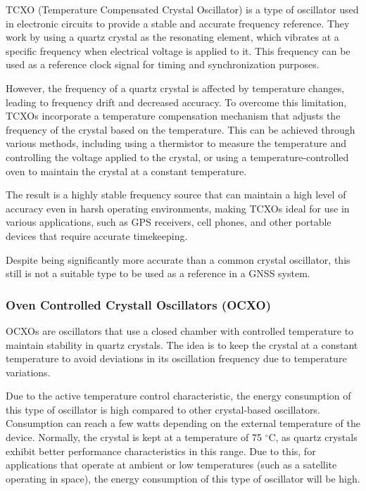 TCXO (Temperature Compensated Crystal Oscillator) is a type of oscillator used in electronic circuits to provide a stable and accurate frequency reference. They work by using a quartz crystal as the resonating element, which vibrates at a specific frequency when electrical voltage is applied to it. This frequency can be used as a reference clock signal for timing and synchronization purposes.

However, the frequency of a quartz crystal is affected by temperature changes, leading to frequency drift and decreased accuracy. To overcome this limitation, TCXOs incorporate a temperature compensation mechanism that adjusts the frequency of the crystal based on the temperature. This can be achieved through various methods, including using a thermistor to measure the temperature and controlling the voltage applied to the crystal, or using a temperature-controlled oven to maintain the crystal at a constant temperature.

The result is a highly stable frequency source that can maintain a high level of accuracy even in harsh operating environments, making TCXOs ideal for use in various applications, such as GPS receivers, cell phones, and other portable devices that require accurate timekeeping.

Despite being significantly more accurate than a common crystal oscillator, this still is not a suitable type to be used as a reference in a GNSS system.

\subsubsection{Oven Controlled Crystall Oscillators (OCXO)}

OCXOs are oscillators that use a closed chamber with controlled temperature to maintain stability in quartz crystals. The idea is to keep the crystal at a constant temperature to avoid deviations in its oscillation frequency due to temperature variations.

Due to the active temperature control characteristic, the energy consumption of this type of oscillator is high compared to other crystal-based oscillators. Consumption can reach a few watts depending on the external temperature of the device. Normally, the crystal is kept at a temperature of 75 $^{\circ}$C, as quartz crystals exhibit better performance characteristics in this range. Due to this, for applications that operate at ambient or low temperatures (such as a satellite operating in space), the energy consumption of this type of oscillator will be high.

